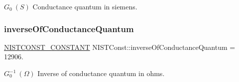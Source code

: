$G_0 \ (S)$ Conductance quantum in siemens. \mbox{\label{group___n_i_s_t_const-_conductance_quantum_ga629e01b406bd14e35a1de57795ac3a75}} 
\subsubsection{\texorpdfstring{inverse\+Of\+Conductance\+Quantum}{inverseOfConductanceQuantum}}
{\footnotesize\ttfamily \mbox{\hyperlink{group___n_i_s_t_const-_macros_ga2b0fc1d7452373f816175dd86ce26729}{N\+I\+S\+T\+C\+O\+N\+S\+T\+\_\+\+C\+O\+N\+S\+T\+A\+NT}} N\+I\+S\+T\+Const\+::inverse\+Of\+Conductance\+Quantum = 12906.}

$G_0^{-1} \ (\Omega)$ Inverse of conductance quantum in ohms. 
